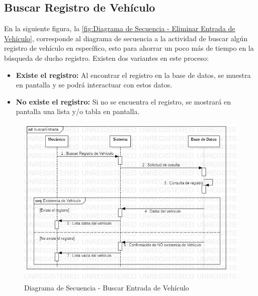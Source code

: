 \subsection{Buscar Registro de Vehículo}
En la siguiente figura, la \ref{fig:Diagrama de Secuencia - Eliminar Entrada de Vehículo}, corresponde al diagrama de secuencia a la actividad de buscar algún registro de vehículo en específico, esto para ahorrar un poco más de tiempo en la búsqueda de ducho registro. Existen dos variantes en este proceso:
\begin{itemize}
	\item \textbf{Existe el registro:} Al encontrar el registro en la base de datos, se muestra en pantalla y se podrá interactuar con estos datos.
	\item \textbf{No existe el registro:} Si no se encuentra el registro, se mostrará en pantalla una lista y/o tabla en pantalla.
\end{itemize}
\begin{figure}[!h]
	\centering
	\includegraphics[width=1\textwidth]{./diseno/vprocesos/imagenes/buscarEntrada}
	\caption{Diagrama de Secuencia - Buscar Entrada de Vehículo}
	\label{fig:Diagrama de Secuencia - Buscar Entrada de Vehículo}
\end{figure}
 \clearpage